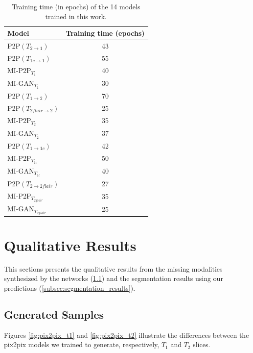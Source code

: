 \begin{table}[H]
\centering
\fontsize{11}{19}\selectfont
\begin{tabular}{l|c}
\toprule
\textbf{Model} & \textbf{Training time (epochs)}\\
\hline
P2P$(T_{2 \rightarrow 1})$ & 43\\
P2P$(T_{1c \rightarrow 1})$ & 55\\
\textrm{MI-P2P{$_{T_{1}}$}} & 40\\

MI-GAN{$_{T_{1}}$} & 30\\
\hline
P2P$(T_{1 \rightarrow 2})$ & 70\\

P2P$(T_{2flair \rightarrow 2})$ & 25\\

\textrm{MI-P2P{$_{T_{2}}$}} & 35\\

MI-GAN{$_{T_{2}}$} & 37\\
\hline
\textrm{P2P$(T_{1 \rightarrow 1c})$} & 42\\

MI-P2P{$_{T_{1c}}$} & 50\\

MI-GAN$_{T_{1c}}$ & 40\\
\hline
P2P$(T_{2 \rightarrow 2flair})$ & 27\\

\textrm{MI-P2P{$_{T_{2flair}}$}} & 35\\

MI-GAN{$_{T_{2flair}}$} & 25\\
\midrule
\end{tabular}
\caption[Training time (in epochs) of every model]{Training time (in epochs) of the 14 models trained in this work.}
\label{tab:epochs_training_time}
\end{table}
\section{Qualitative Results}
\label{sec:qualitative_results}
This sections presents the qualitative results from  the missing modalities synthesized by the networks (\ref{subsec:generated_samples}) and the segmentation results using our predictions (\ref{subsec:segmentation_results}).
\subsection{Generated Samples}
\label{subsec:generated_samples}
Figures \ref{fig:pix2pix_t1} and \ref{fig:pix2pix_t2} illustrate the differences between the pix2pix models we trained to generate, respectively, $T_{1}$ and $T_{2}$ slices.

